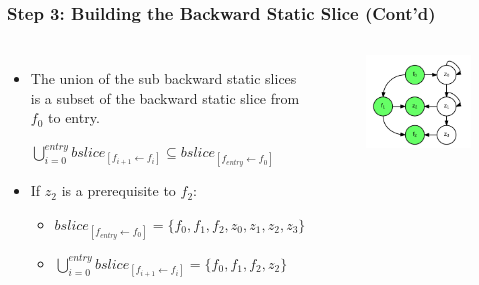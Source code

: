 \documentclass{beamer}
\begin{document}
\begin{frame}
\frametitle{Step 3: Building the Backward Static Slice (Cont'd)}

\begin{columns}[c] %

\begin{itemize}

\item The union of the sub backward static slices is a subset of the backward static slice from $f_0$ to entry.

\begin{center}
$\bigcup_{i=0}^{entry} bslice_{[f_{i+1} \leftarrow f_i]} \subseteq bslice_{[f_{entry} \leftarrow f_0]}$ 
\end{center}
\vspace{0.5cm}
\item If $z_2$ is a prerequisite to $f_2$:
\begin{itemize}
\item $bslice_{[f_{entry} \leftarrow f_0]} = \{f_0, f_1, f_2, z_0, z_1, z_2, z_3\}$
\vspace{0.3cm}
\item $\bigcup_{i=0}^{entry} bslice_{[f_{i+1} \leftarrow f_i]} = \{f_0, f_1, f_2, z_2\}$
\end{itemize}

\end{itemize}


\begin{figure}
\includegraphics[width=0.95\linewidth]{media/slices.png}
\end{figure}

\end{columns}


\end{frame}
\end{document}
